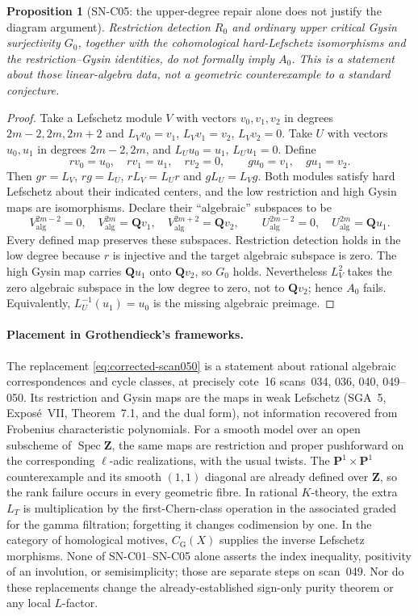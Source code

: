 \documentclass[11pt,a4paper]{article}
\newtheorem{proposition}[theorem]{Proposition}
\theoremstyle{definition}
\theoremstyle{remark}
\begin{document}
\begin{proposition}[SN-C05: the upper-degree repair alone does not justify the diagram argument]
\label{prop:formal-critical-obstruction}
Restriction detection $R_0$ and ordinary upper critical Gysin
surjectivity $G_0$, together with the cohomological hard-Lefschetz
isomorphisms and the restriction--Gysin identities, do not formally
imply $A_0$.  This is a statement about those linear-algebra data,
not a geometric counterexample to a standard conjecture.
\end{proposition}
\begin{proof}
Take a Lefschetz module $V$ with vectors $v_0,v_1,v_2$ in degrees
$2m-2,2m,2m+2$ and $L_Vv_0=v_1$, $L_Vv_1=v_2$, $L_Vv_2=0$.
Take $U$ with vectors $u_0,u_1$ in degrees $2m-2,2m$, and
$L_Uu_0=u_1$, $L_Uu_1=0$.  Define
\[
 rv_0=u_0,\quad rv_1=u_1,\quad rv_2=0,
 \qquad gu_0=v_1,\quad gu_1=v_2.
\]
Then $gr=L_V$, $rg=L_U$, $rL_V=L_Ur$ and $gL_U=L_Vg$.
Both modules satisfy hard Lefschetz about their indicated centers,
and the low restriction and high Gysin maps are isomorphisms.
Declare their ``algebraic'' subspaces to be
\[
 V_{\mathrm{alg}}^{2m-2}=0,\quad
 V_{\mathrm{alg}}^{2m}=\mathbf Qv_1,\quad
 V_{\mathrm{alg}}^{2m+2}=\mathbf Qv_2,
 \qquad
 U_{\mathrm{alg}}^{2m-2}=0,\quad
 U_{\mathrm{alg}}^{2m}=\mathbf Qu_1.
\]
Every defined map preserves these subspaces.  Restriction detection
holds in the low degree because $r$ is injective and the target
algebraic subspace is zero.  The high Gysin map carries
$\mathbf Qu_1$ onto $\mathbf Qv_2$, so $G_0$ holds.  Nevertheless
$L_V^2$ takes the zero algebraic subspace in the low degree to zero,
not to $\mathbf Qv_2$; hence $A_0$ fails.  Equivalently,
$L_U^{-1}(u_1)=u_0$ is the missing algebraic preimage.
\end{proof}

\paragraph{Placement in Grothendieck's frameworks.}
The replacement \eqref{eq:corrected-scan050} is a statement about
rational algebraic correspondences and cycle classes, at precisely
cote~16 scans~034, 036, 040, 049--050.  Its restriction and Gysin
maps are the maps in weak Lefschetz (SGA~5, Expos\'e~VII,
Theorem~7.1, and the dual form), not information recovered from
Frobenius characteristic polynomials.  For a smooth model over an
open subscheme of $\operatorname{Spec}\mathbf Z$, the same maps
are restriction and proper pushforward on the corresponding
\(\ell\)-adic realizations, with the usual twists.  The
$\mathbf P^1\times\mathbf P^1$ counterexample and its smooth
$(1,1)$ diagonal are already defined over $\mathbf Z$, so the
rank failure occurs in every geometric fibre.  In rational
$K$-theory, the extra $L_T$ is multiplication by the first-Chern-class
operation in the associated graded for the gamma filtration;
forgetting it changes codimension by one.  In the category of
homological motives, $C_{\mathrm G}(X)$ supplies the inverse
Lefschetz morphisms.  None of SN-C01--SN-C05 alone asserts the
index inequality, positivity of an involution, or semisimplicity;
those are separate steps on scan~049.  Nor do these replacements
change the already-established sign-only purity theorem or any
local $L$-factor.
\end{document}
